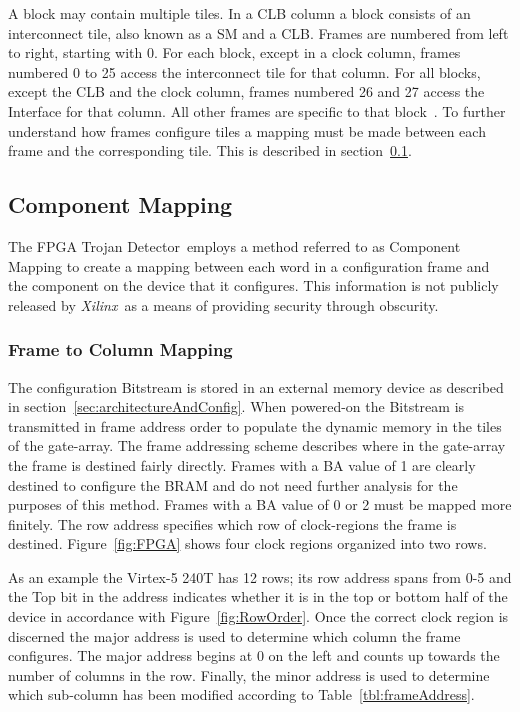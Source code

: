 \documentclass[conference]{IEEEtran}
\newcommand{\Xilinx}{\textit{\gls{Xilinx}}~}
\newcommand{\Name}{\acrshort{FPGA} Trojan Detector}
\newcommand{\NameNoPeriod}{\Name~}
\begin{document}
A block may contain multiple tiles.
In a \acrshort{CLB} column a block consists of an interconnect tile, also known as a \acrfull{SM} and a \acrshort{CLB}.
Frames are numbered from left to right, starting with 0. 
For each block, except in a clock column, frames numbered 0 to 25 access the interconnect tile for that column. 
For all blocks, except the \acrshort{CLB} and the clock column, frames numbered 26 and 27 access the Interface for that column. 
All other frames are specific to that block~\cite{virtex5ConfigGuide}.
To further understand how frames configure tiles a mapping must be made between each frame and the corresponding tile.
This is described in section~\ref{sec:tileMapping}.

\subsection{Component Mapping} \label{sec:tileMapping}
The \NameNoPeriod employs a method referred to as Component Mapping to create a mapping between each word in a configuration frame and the component on the device that it configures.
This information is not publicly released by \Xilinx as a means of providing security through obscurity.

\subsubsection{Frame to Column Mapping}
The configuration \gls{Bitstream} is stored in an external memory device as described in section~\ref{sec:architectureAndConfig}.
When powered-on the \gls{Bitstream} is transmitted in frame address order to populate the dynamic memory in the tiles of the gate-array.
The frame addressing scheme describes where in the gate-array the frame is destined fairly directly.
Frames with a \acrshort{BA} value of 1 are clearly destined to configure the \acrshort{BRAM} and do not need further analysis for the purposes of this method.
Frames with a \acrshort{BA} value of 0 or 2 must be mapped more finitely.
The row address specifies which row of clock-regions the frame is destined.
Figure~\ref{fig:FPGA} shows four clock regions organized into two rows. 

As an example the Virtex-5 240T has 12 rows; its row address spans from 0-5 and the Top bit in the address indicates whether it is in the top or bottom half of the device in accordance with Figure~\ref{fig:RowOrder}.
Once the correct clock region is discerned the major address is used to determine which column the frame configures.
The major address begins at 0 on the left and counts up towards the number of columns in the row.
Finally, the minor address is used to determine which sub-column has been modified according to Table~\ref{tbl:frameAddress}.
\end{document}
